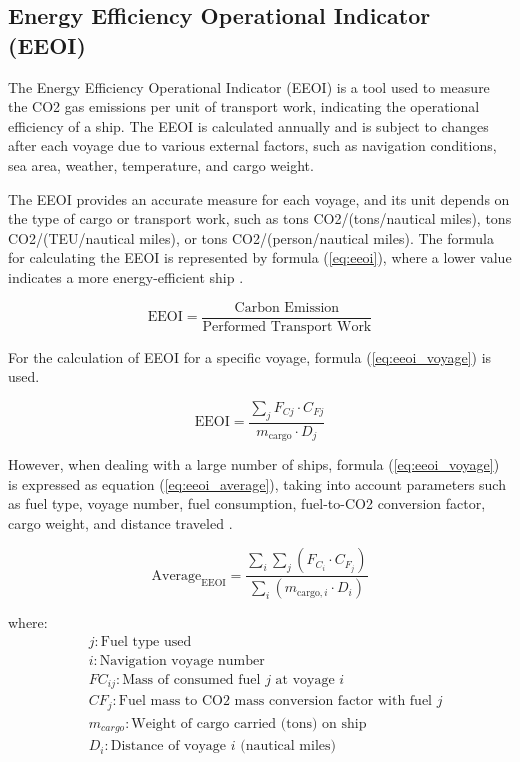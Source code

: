 \subsection{Energy Efficiency Operational Indicator (EEOI)}

The Energy Efficiency Operational Indicator (EEOI) is a tool used to measure the CO2 gas emissions per unit of transport work, indicating the operational efficiency of a ship.
The EEOI is calculated annually and is subject to changes after each voyage due to various external factors, such as navigation conditions, sea area, weather, temperature, and cargo weight.

The EEOI provides an accurate measure for each voyage, and its unit depends on the type of cargo or transport work, such as tons CO2/(tons/nautical miles), tons CO2/(TEU/nautical miles), or tons CO2/(person/nautical miles).
The formula for calculating the EEOI is represented by formula (\ref{eq:eeoi}), where a lower value indicates a more energy-efficient ship \autocite{prill2020new}.

\begin{equation}
    \text{EEOI} = \frac{\text{Carbon Emission}}{\text{Performed Transport Work}}
    \label{eq:eeoi}
\end{equation}

For the calculation of EEOI for a specific voyage, formula (\ref{eq:eeoi_voyage}) is used.

\begin{equation}
    \text{EEOI} = \frac{\sum_{j} F_{Cj} \cdot C_{Fj}}{m_{\text{cargo}} \cdot D_j}
    \label{eq:eeoi_voyage}
\end{equation}

However, when dealing with a large number of ships, formula (\ref{eq:eeoi_voyage}) is expressed as equation (\ref{eq:eeoi_average}), taking into account parameters such as fuel type, voyage number, fuel consumption, fuel-to-CO2 conversion factor, cargo weight, and distance traveled \autocite{tran2017research}.

\begin{equation}
    \text{Average}_{\text{EEOI}} = \frac{\sum_{i}\sum_{j}(F_{C_{i}} \cdot C_{F_{j}})}{\sum_{i}(m_{\text{cargo},i} \cdot D_{i})}
    \label{eq:eeoi_average}
\end{equation}

where:
\begin{align*}
     & j: \text{Fuel type used}                                            \\
     & i: \text{Navigation voyage number}                                  \\
     & FC_{ij}: \text{Mass of consumed fuel } j \text{ at voyage } i       \\
     & CF_{j}: \text{Fuel mass to CO2 mass conversion factor with fuel } j \\
     & m_{cargo}: \text{Weight of cargo carried (tons) on ship}            \\
     & D_{i}: \text{Distance of voyage } i \text{ (nautical miles)}
\end{align*}

